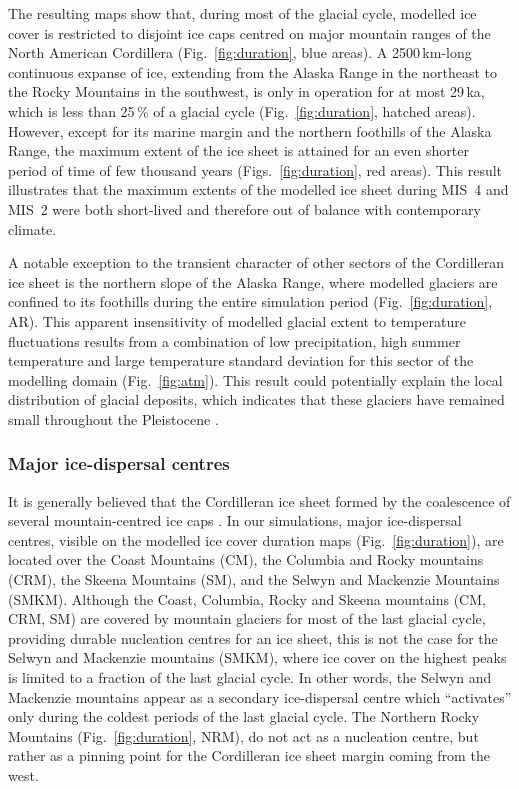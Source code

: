 \documentclass[tc]{copernicus}
\begin{document}
The resulting maps show that, during most of the glacial cycle, modelled ice
cover is restricted to disjoint ice caps centred on major mountain ranges of
the North American Cordillera (Fig.~\ref{fig:duration}, blue areas). A
2500\,km-long continuous expanse of ice, extending from the Alaska Range in the
northeast to the Rocky Mountains in the southwest, is only in operation
for at most 29\,ka, which is less than 25\,\% of a glacial cycle
(Fig.~\ref{fig:duration}, hatched areas). However,
except for its marine margin and the northern foothills of the Alaska Range,
the maximum extent of the ice sheet is attained for an even shorter period
of time of few thousand years (Figs.~\ref{fig:duration}, red areas). This
result illustrates that the maximum extents of the modelled ice sheet during
MIS~4 and MIS~2 were both short-lived and therefore out of balance with
contemporary climate.

A notable exception to the transient character of other sectors of the
Cordilleran ice sheet
is the northern slope of the Alaska Range, where modelled glaciers are confined
to its foothills during the entire simulation period (Fig.~\ref{fig:duration},
AR). This apparent insensitivity of modelled glacial extent to temperature
fluctuations results from a combination of low precipitation, high summer
temperature and large temperature standard deviation for this sector of the
modelling domain (Fig.~\ref{fig:atm}). This result could potentially explain
the local distribution of glacial deposits, which indicates that these glaciers
have remained small throughout the Pleistocene \citep{Kaufman.Manley.2004}.

\subsubsection{Major ice-dispersal centres}

It is generally believed that the Cordilleran ice sheet formed by the
coalescence of several mountain-centred ice caps \citep{Davis.Mathews.1944}.
In our simulations, major ice-dispersal centres, visible on the modelled ice
cover duration maps (Fig.~\ref{fig:duration}), are located over the Coast
Mountains (CM), the Columbia and Rocky mountains (CRM), the Skeena Mountains
(SM), and the Selwyn and Mackenzie Mountains (SMKM). Although the Coast,
Columbia, Rocky and Skeena mountains (CM, CRM, SM) are covered by mountain
glaciers for most of the last glacial cycle, providing durable nucleation
centres for an ice sheet, this is not the case for the Selwyn and
Mackenzie mountains (SMKM), where ice cover on the highest peaks is limited to a
fraction of the last glacial cycle. In other words, the Selwyn and Mackenzie
mountains appear as a secondary ice-dispersal centre which ``activates'' only
during the coldest periods of the last glacial cycle. The Northern Rocky
Mountains (Fig.~\ref{fig:duration}, NRM), do not act as a nucleation centre,
but rather as a pinning point for the Cordilleran ice sheet margin coming from
the west.
\end{document}
